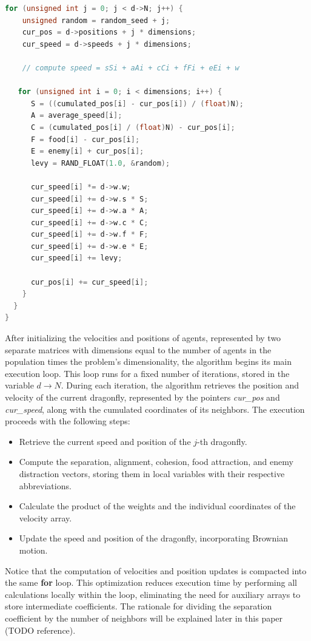 \documentclass[10pt]{article}
\begin{document}
\begin{multicols}{2}
\begin{lstlisting}[language=C,caption={first implementation of the dragonfly algorithm}]
  for (unsigned int j = 0; j < d->N; j++) {
    unsigned random = random_seed + j;
    cur_pos = d->positions + j * dimensions;
    cur_speed = d->speeds + j * dimensions;

    // compute speed = sSi + aAi + cCi + fFi + eEi + w

   for (unsigned int i = 0; i < dimensions; i++) {
      S = ((cumulated_pos[i] - cur_pos[i]) / (float)N);
      A = average_speed[i];
      C = (cumulated_pos[i] / (float)N) - cur_pos[i];
      F = food[i] - cur_pos[i];
      E = enemy[i] + cur_pos[i];
      levy = RAND_FLOAT(1.0, &random);

      cur_speed[i] *= d->w.w;
      cur_speed[i] += d->w.s * S;
      cur_speed[i] += d->w.a * A;
      cur_speed[i] += d->w.c * C;
      cur_speed[i] += d->w.f * F;
      cur_speed[i] += d->w.e * E;
      cur_speed[i] += levy;

      cur_pos[i] += cur_speed[i];
    }
  }
}
\end{lstlisting}

\noindent After initializing the velocities and positions of agents,
represented by two separate matrices with dimensions equal to the number of agents in the population times the problem's dimensionality, the algorithm begins its main execution loop.
This loop runs for a fixed number of iterations, stored in the variable $d\rightarrow N$.
During each iteration, the algorithm retrieves the position and velocity of the current dragonfly, represented by the pointers \textit{cur\_pos} and \textit{cur\_speed}, along with the cumulated coordinates of its neighbors.
The execution proceeds with the following steps:

\begin{itemize}
  \item Retrieve the current speed and position of the $j$-th dragonfly.
  \item Compute the separation, alignment, cohesion, food attraction, and enemy distraction vectors, storing them in local variables with their respective abbreviations.
  \item Calculate the product of the weights and the individual coordinates of the velocity array.
  \item Update the speed and position of the dragonfly, incorporating Brownian motion.
\end{itemize}

\noindent Notice that the computation of velocities and position updates is compacted into the same \textbf{for} loop.
This optimization reduces execution time by performing all calculations locally within the loop, eliminating the need for auxiliary arrays to store intermediate coefficients.
The rationale for dividing the separation coefficient by the number of neighbors will be explained later in this paper (TODO reference).


\end{multicols}
\end{document}
